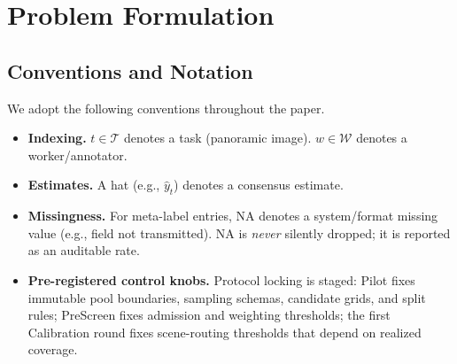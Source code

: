 \section{Problem Formulation}
\label{sec:problem-formulation}

\subsection{Conventions and Notation}
\label{sec:conventions-notation}

We adopt the following conventions throughout the paper.
\begin{itemize}
  \item \textbf{Indexing.} $t\in\mathcal{T}$ denotes a task (panoramic image). $w\in\mathcal{W}$ denotes a worker/annotator.
  \item \textbf{Estimates.} A hat (e.g., $\hat{y}_t$) denotes a consensus estimate.
  \item \textbf{Missingness.} For meta-label entries, NA denotes a system/format missing value (e.g., field not transmitted). NA is \emph{never} silently dropped; it is reported as an auditable rate.
  \item \textbf{Pre-registered control knobs.} Protocol locking is staged: Pilot fixes immutable pool boundaries, sampling schemas, candidate grids, and split rules; PreScreen fixes admission and weighting thresholds; the first Calibration round fixes scene-routing thresholds that depend on realized coverage.
\end{itemize}

